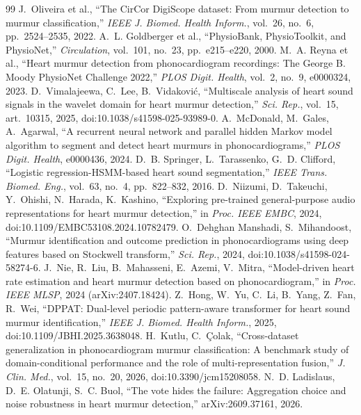\documentclass[11pt,a4paper]{article}
\begin{document}
\begin{thebibliography}{99}\small
{} J.~Oliveira et al., ``The CirCor DigiScope dataset: From murmur detection to murmur classification,'' \emph{IEEE J. Biomed. Health Inform.}, vol.~26, no.~6, pp.~2524--2535, 2022.
 A.~L. Goldberger et al., ``PhysioBank, PhysioToolkit, and PhysioNet,'' \emph{Circulation}, vol.~101, no.~23, pp.~e215--e220, 2000.
 M.~A. Reyna et al., ``Heart murmur detection from phonocardiogram recordings: The George B. Moody PhysioNet Challenge 2022,'' \emph{PLOS Digit. Health}, vol.~2, no.~9, e0000324, 2023.
 D.~Vimalajeewa, C.~Lee, B.~Vidaković, ``Multiscale analysis of heart sound signals in the wavelet domain for heart murmur detection,'' \emph{Sci. Rep.}, vol.~15, art.~10315, 2025, doi:10.1038/s41598-025-93989-0.
 A.~McDonald, M.~Gales, A.~Agarwal, ``A recurrent neural network and parallel hidden Markov model algorithm to segment and detect heart murmurs in phonocardiograms,'' \emph{PLOS Digit. Health}, e0000436, 2024.
 D.~B. Springer, L.~Tarassenko, G.~D. Clifford, ``Logistic regression-HSMM-based heart sound segmentation,'' \emph{IEEE Trans. Biomed. Eng.}, vol.~63, no.~4, pp.~822--832, 2016.
 D.~Niizumi, D.~Takeuchi, Y.~Ohishi, N.~Harada, K.~Kashino, ``Exploring pre-trained general-purpose audio representations for heart murmur detection,'' in \emph{Proc. IEEE EMBC}, 2024, doi:10.1109/EMBC53108.2024.10782479.
 O.~Dehghan Manshadi, S.~Mihandoost, ``Murmur identification and outcome prediction in phonocardiograms using deep features based on Stockwell transform,'' \emph{Sci. Rep.}, 2024, doi:10.1038/s41598-024-58274-6.
 J.~Nie, R.~Liu, B.~Mahasseni, E.~Azemi, V.~Mitra, ``Model-driven heart rate estimation and heart murmur detection based on phonocardiogram,'' in \emph{Proc. IEEE MLSP}, 2024 (arXiv:2407.18424).
 Z.~Hong, W.~Yu, C.~Li, B.~Yang, Z.~Fan, R.~Wei, ``DPPAT: Dual-level periodic pattern-aware transformer for heart sound murmur identification,'' \emph{IEEE J. Biomed. Health Inform.}, 2025, doi:10.1109/JBHI.2025.3638048.
 H.~Kutlu, C.~Çolak, ``Cross-dataset generalization in phonocardiogram murmur classification: A benchmark study of domain-conditional performance and the role of multi-representation fusion,'' \emph{J. Clin. Med.}, vol.~15, no.~20, 2026, doi:10.3390/jcm15208058.
 N.~D. Ladislaus, D.~E. Olatunji, S.~C. Buol, ``The vote hides the failure: Aggregation choice and noise robustness in heart murmur detection,'' arXiv:2609.37161, 2026.

\end{thebibliography}
\end{document}
